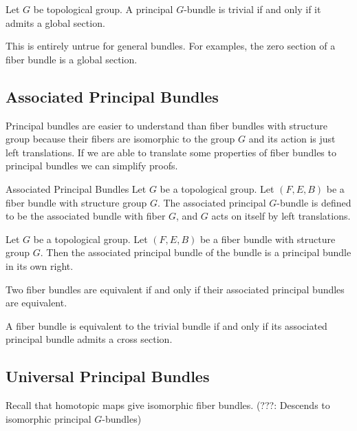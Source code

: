 \documentclass[a4paper]{article}
\begin{document}
\begin{thm}{}{} Let $G$ be topological group. A principal $G$-bundle is trivial if and only if it admits a global section. 
\end{thm}

This is entirely untrue for general bundles. For examples, the zero section of a fiber bundle is a global section. 

\subsection{Associated Principal Bundles}
Principal bundles are easier to understand than fiber bundles with structure group because their fibers are isomorphic to the group $G$ and its action is just left translations. If we are able to translate some properties of fiber bundles to principal bundles we can simplify proofs. 

\begin{defn}{Associated Principal Bundles}{} Let $G$ be a topological group. Let $(F,E,B)$ be a fiber bundle with structure group $G$. The associated principal $G$-bundle is defined to be the associated bundle with fiber $G$, and $G$ acts on itself by left translations. 
\end{defn}

\begin{prp}{}{} Let $G$ be a topological group. Let $(F,E,B)$ be a fiber bundle with structure group $G$. Then the associated principal bundle of the bundle is a principal bundle in its own right. 
\end{prp}

\begin{thm}{}{} Two fiber bundles are equivalent if and only if their associated principal bundles are equivalent. 
\end{thm}

\begin{crl}{}{} A fiber bundle is equivalent to the trivial bundle if and only if its associated principal bundle admits a cross section. 
\end{crl}

\subsection{Universal Principal Bundles}
Recall that homotopic maps give isomorphic fiber bundles. (???: Descends to isomorphic principal $G$-bundles)
\end{document}
